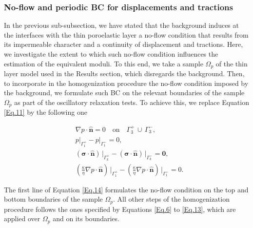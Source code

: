 \documentclass[draft]{agujournal2019}
\begin{document}
\subsubsection{No-flow and periodic BC for displacements and tractions} 

In the previous sub-subsection, we have stated that the background induces at the interfaces with the thin poroelastic layer a no-flow condition that results from its impermeable character and a continuity of displacement and tractions. Here, we investigate the extent to which such no-flow condition influences the estimation of the equivalent moduli. To this end, we  take a sample $\Omega_p$ of the thin layer model used in the Results section, which disregards the background. Then, to incorporate in the homogenization procedure the no-flow condition imposed by the background, we formulate such BC on the relevant boundaries of the sample $\Omega_p$ as part of the  oscillatory relaxation tests. To achieve this, we replace Equation \ref{Eq.11} by the following one
\begin{linenomath*}
\begin{equation}\label{Eq.14}
\begin{split}
& \nabla p \cdot \bm{\hat n}  = 0 \quad \text{on}\quad \Gamma_3^+ \, \cup \, \Gamma_3^-,\\
& p\vert_{\Gamma_1^+}-p\vert_{\Gamma_1^-} =0, \\
& \left(\bm{\sigma}\cdot \bm{\hat n} \right)\, \vert_{\Gamma_k^+}-\left(\bm{\sigma}\cdot \bm{\hat n} \right)\, \vert_{\Gamma_k^-} = \bm{0},\\
&\left( \frac{\kappa}{\eta} \nabla p \cdot \bm{\hat n} \right) \, \vert_{\Gamma_1^+} -\left( \frac{\kappa}{\eta} \nabla p \cdot \bm{\hat n} \right) \, \vert_{\Gamma_1^-} = 0.
\end{split}
\end{equation}
\end{linenomath*}
The first line of Equation \eqref{Eq.14} formulates the no-flow condition on the top and bottom boundaries of the sample $\Omega_p$. All other steps of the homogenization procedure follows the ones specified by Equations \eqref{Eq.6} to \eqref{Eq.13}, which are applied over $\Omega_p$ and on its boundaries.
\end{document}
